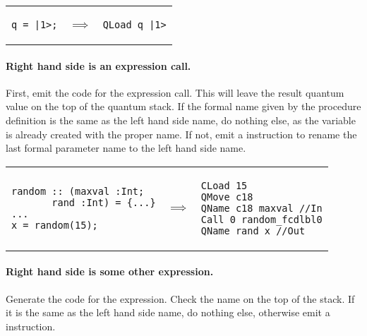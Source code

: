 \begin{center}
\begin{tabular}{p{1in}p{.3in}p{1.5in}}
{\begin{singlespace}
\begin{lstlisting}[style=linqpl]
q = |1>;
\end{lstlisting}
\end{singlespace}}
 & { $\implies$} &
{\begin{singlespace}
\begin{lstlisting}[style=linqpl]
     QLoad q |1>
\end{lstlisting}
\end{singlespace}}
\end{tabular}
\end{center}


\paragraph{Right hand side is an expression call.}
First, emit the code for the expression call. This will leave the
result quantum value on the top of the quantum stack. If the
formal name given by the procedure definition is the same as the
left hand side name, do nothing else, as the variable is already
created with the proper name. If not, emit a  instruction
to rename the last formal parameter name to the left hand side name.

\begin{center}
\begin{tabular}{p{2in}p{.3in}p{1.5in}}
{\begin{singlespace}
\begin{lstlisting}[style=linqpl]
random :: (maxval :Int; 
       rand :Int) = {...}
...
x = random(15);
\end{lstlisting}
\end{singlespace}}
 & { \qquad \qquad \quad \quad \qquad \qquad $\implies$} &
{\begin{singlespace}
\begin{lstlisting}[style=linqpl]
CLoad 15
QMove c18
QName c18 maxval //In
Call 0 random_fcdlbl0
QName rand x //Out
\end{lstlisting}
\end{singlespace}}
\end{tabular}
\end{center}


\paragraph{Right hand side is some other expression.}
Generate the code for the expression. Check the name on the top of
the stack. If it is the same as the left hand side name, do nothing else,
otherwise emit a  instruction.


